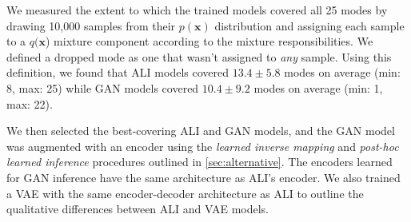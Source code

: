 \documentclass{article}
\begin{document}
We measured the extent to which the trained models covered all 25 modes by
drawing 10,000 samples from their $p(\bm{x})$ distribution and assigning each
sample to a $q(\bm{x}$) mixture component according to the mixture
responsibilities. We defined a dropped mode as one that wasn’t assigned to {\em
any} sample. Using this definition, we found that ALI models covered $13.4 \pm
5.8$ modes on average (min: 8, max: 25) while GAN models covered $10.4 \pm 9.2$
modes on average (min: 1, max: 22).

We then selected the best-covering ALI and GAN models, and the GAN model was
augmented with an encoder using the {\em learned inverse mapping} and {\em
post-hoc learned inference} procedures outlined in \autoref{sec:alternative}.
The encoders learned for GAN inference have the same architecture as ALI’s
encoder.  We also trained a VAE with the same encoder-decoder architecture as
ALI to outline the qualitative differences between ALI and VAE models.
\end{document}
